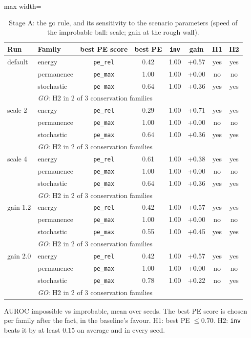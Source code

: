 \begin{table}[t]\centering\small
\caption{Stage A: the go rule, and its sensitivity to the scenario parameters (speed of the improbable ball: scale; gain at the rough wall).}\label{tab:sensitivity}
\begin{adjustbox}{max width=\linewidth}\begin{tabular}{llcccccc}\toprule
Run & Family & best PE score & best PE & \texttt{inv} & gain & H1 & H2\\\midrule
default & energy & \texttt{pe\_rel} & 0.42 & 1.00 & +0.57 & yes & yes\\
 & permanence & \texttt{pe\_max} & 1.00 & 1.00 & +0.00 & no & no\\
 & stochastic & \texttt{pe\_max} & 0.64 & 1.00 & +0.36 & yes & yes\\
& \multicolumn{7}{l}{\emph{GO}: H2 in 2 of 3 conservation families}\\\midrule
scale 2 & energy & \texttt{pe\_rel} & 0.29 & 1.00 & +0.71 & yes & yes\\
 & permanence & \texttt{pe\_max} & 1.00 & 1.00 & +0.00 & no & no\\
 & stochastic & \texttt{pe\_max} & 0.64 & 1.00 & +0.36 & yes & yes\\
& \multicolumn{7}{l}{\emph{GO}: H2 in 2 of 3 conservation families}\\\midrule
scale 4 & energy & \texttt{pe\_rel} & 0.61 & 1.00 & +0.38 & yes & yes\\
 & permanence & \texttt{pe\_max} & 1.00 & 1.00 & +0.00 & no & no\\
 & stochastic & \texttt{pe\_max} & 0.64 & 1.00 & +0.36 & yes & yes\\
& \multicolumn{7}{l}{\emph{GO}: H2 in 2 of 3 conservation families}\\\midrule
gain 1.2 & energy & \texttt{pe\_rel} & 0.42 & 1.00 & +0.57 & yes & yes\\
 & permanence & \texttt{pe\_max} & 1.00 & 1.00 & +0.00 & no & no\\
 & stochastic & \texttt{pe\_max} & 0.55 & 1.00 & +0.45 & yes & yes\\
& \multicolumn{7}{l}{\emph{GO}: H2 in 2 of 3 conservation families}\\\midrule
gain 2.0 & energy & \texttt{pe\_rel} & 0.42 & 1.00 & +0.57 & yes & yes\\
 & permanence & \texttt{pe\_max} & 1.00 & 1.00 & +0.00 & no & no\\
 & stochastic & \texttt{pe\_max} & 0.78 & 1.00 & +0.22 & no & yes\\
& \multicolumn{7}{l}{\emph{GO}: H2 in 2 of 3 conservation families}\\\bottomrule
\end{tabular}\end{adjustbox}
\par\smallskip\footnotesize AUROC impossible vs improbable, mean over seeds. The best PE score is chosen per family after the fact, in the baseline's favour. H1: best PE $\le 0.70$. H2: \texttt{inv} beats it by at least 0.15 on average and in every seed.
\end{table}
